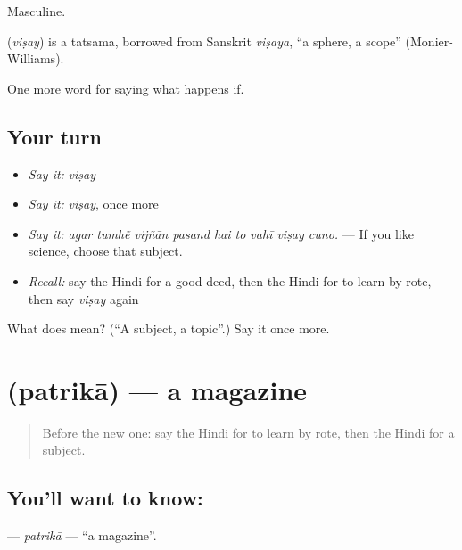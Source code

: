 Masculine.

\begin{cousinweb}
\textbf{} (\emph{viṣay}) is a tatsama, borrowed from Sanskrit \emph{viṣaya}, \textquotedblleft{}a sphere, a scope\textquotedblright{} (Monier-Williams).
\end{cousinweb}

\begin{grammarlens}[title={What you've built}]
One more word for saying what happens if.
\end{grammarlens}

\subsection*{Your turn}
\begin{itemize}
\raggedright
  \item \emph{Say it:} \emph{viṣay}
  \item \emph{Say it:} \emph{viṣay}, once more
  \item \emph{Say it:} \emph{agar tumhẽ vijñān pasand hai to vahī viṣay cuno.} — If you like science, choose that subject.
  \item \emph{Recall:} say the Hindi for a good deed, then the Hindi for to learn by rote, then say \emph{viṣay} again
\end{itemize}

\begin{tcolorbox}[breakable,colback=teal!4,colframe=teal!35!black,title={Before you move on}]
What does  mean? (\textquotedblleft{}A subject, a topic\textquotedblright{}.) Say it once more.
\end{tcolorbox}
\section[\texorpdfstring{\hi{पत्रिका} (patrikā)}{पत्रिका (patrikā)}]{ (patrikā) — a magazine}

\label{lesson:HI-C397-patrika}



\begin{quote}
Before the new one: say the Hindi for to learn by rote, then the Hindi for a subject.
\end{quote}

\subsection*{You'll want to know: }
\textbf{} — \emph{patrikā} — \textquotedblleft{}a magazine\textquotedblright{}.

